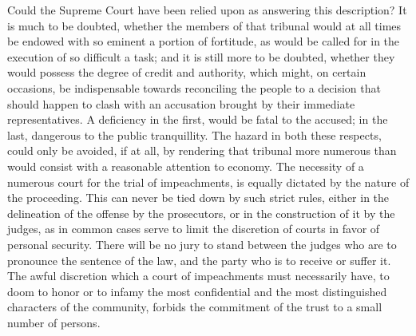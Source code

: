 Could the Supreme Court have been relied upon as answering this description? It is much to be doubted, whether the members of that tribunal would at all times be endowed with so eminent a portion of fortitude, as would be called for in the execution of so difficult a task; and it is still more to be doubted, whether they would possess the degree of credit and authority, which might, on certain occasions, be indispensable towards reconciling the people to a decision that should happen to clash with an accusation brought by their immediate representatives. A deficiency in the first, would be fatal to the accused; in the last, dangerous to the public tranquillity. The hazard in both these respects, could only be avoided, if at all, by rendering that tribunal more numerous than would consist with a reasonable attention to economy. The necessity of a numerous court for the trial of impeachments, is equally dictated by the nature of the proceeding. This can never be tied down by such strict rules, either in the delineation of the offense by the prosecutors, or in the construction of it by the judges, as in common cases serve to limit the discretion of courts in favor of personal security. There will be no jury to stand between the judges who are to pronounce the sentence of the law, and the party who is to receive or suffer it. The awful discretion which a court of impeachments must necessarily have, to doom to honor or to infamy the most confidential and the most distinguished characters of the community, forbids the commitment of the trust to a small number of persons.

